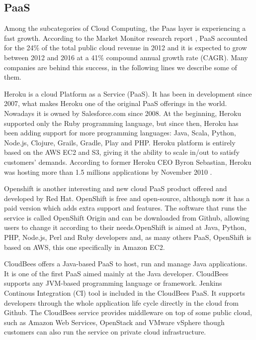\subsection{PaaS}
Among the subcategories of Cloud Computing, the Paas layer is experiencing a fast growth. According to the Market Monitor research report \cite{aslett2013451}, PaaS accounted for the 24\% of the total public cloud revenue in 2012 and it is expected to grow between 2012 and 2016 at a 41\% compound annual growth rate (CAGR). Many companies are behind this success, in the following lines we describe some of them.
\par
Heroku \cite{heroku} is a cloud Platform as a Service (PaaS). It has been in development since 2007, what makes Heroku one of the original PaaS offerings in the world. Nowadays it is owned by Salesforce.com since 2008. At the beginning, Heroku supported only the Ruby programming language, but since then, Heroku has been adding support for more programming languages: Java, Scala, Python, Node.js, Clojure, Grails, Gradle, Play and PHP. Heroku platform is entirely based on the AWS EC2 and S3, giving it the ability to scale in/out to satisfy customers' demands.
According to former Heroku CEO Byron Sebastian, Heroku was hosting more than 1.5 millions applications by November 2010 \cite{Heroku:gigaom}.
\par
Openshift \cite{OpenShift} is another interesting and new cloud PaaS product offered and developed by Red Hat. OpenShift is free and open-source, although now it has a paid version which adds extra support and features. The software that runs the service is called OpenShift Origin \cite{OpenShiftOrigin} and can be downloaded from Github, allowing users to change it according to their needs.OpenShift is aimed at Java, Python, PHP, Node.js, Perl and Ruby developers and, as many others PaaS, OpenShift is based on AWS, this one specifically in Amazon EC2.
\par
CloudBees \cite{CloudBees}
offers a Java-based PaaS to host, run and manage Java applications. It is one of the first PaaS aimed mainly at the Java developer. CloudBees supports any JVM-based programming language or framework. Jenkins Continous Integration (CI) tool is included in the CloudBees PaaS. It supports developers through the whole application life cycle directly in the cloud from Github. The CloudBees service provides middleware on top of some public cloud, such as Amazon Web Services, OpenStack and VMware vSphere though customers can also run the service on private cloud infrastructure.

